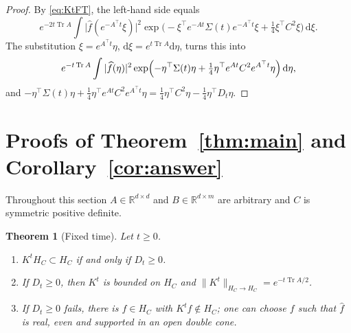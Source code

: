 \documentclass[11pt]{amsart}
\numberwithin{equation}{section}
\newtheorem{theorem}{Theorem}[section]
\theoremstyle{definition}
\theoremstyle{remark}
\newcommand{\R}{\mathbb{R}}
\newcommand{\Tr}{\operatorname{Tr}}
\newcommand{\dd}{\,\mathrm{d}}
\newcommand{\hatf}[1]{\widehat{#1}}
\newcommand{\tp}{\top}
\begin{document}
\begin{proof}
By \eqref{eq:KtFT}, the left-hand side equals
\[
e^{-2t\Tr A}\int\bigl|\hatf f(e^{-A^\tp t}\xi)\bigr|^2
\exp\bigl(-\xi^\tp e^{-At}\Sigma(t)e^{-A^\tp t}\xi+\tfrac14\xi^\tp C^2\xi\bigr)\dd\xi .
\]
The substitution $\xi=e^{A^\tp t}\eta$, $\mathrm d\xi=e^{t\Tr A}\mathrm d\eta$, turns this into
\[
e^{-t\Tr A}\int|\hatf f(\eta)|^2\exp\Bigl(-\eta^\tp\Sigma(t)\eta+\tfrac14\eta^\tp e^{At}C^2e^{A^\tp t}\eta\Bigr)\dd\eta ,
\]
and $-\eta^\tp\Sigma(t)\eta+\frac14\eta^\tp e^{At}C^2e^{A^\tp t}\eta=\frac14\eta^\tp C^2\eta-\frac14\eta^\tp D_t\eta$.
\end{proof}

\section{Proofs of Theorem~\ref{thm:main} and Corollary~\ref{cor:answer}}\label{sec:proofs}

Throughout this section $A\in\R^{d\times d}$ and $B\in\R^{d\times m}$ are arbitrary and $C$ is symmetric positive
definite.

\begin{theorem}[Fixed time]\label{thm:fixed}
Let $t\ge0$.
\begin{enumerate}
\item[(a)] $K^tH_C\subset H_C$ if and only if $D_t\ge0$.
\item[(b)] If $D_t\ge0$, then $K^t$ is bounded on $H_C$ and $\|K^t\|_{H_C\to H_C}=e^{-t\Tr A/2}$.
\item[(c)] If $D_t\ge0$ fails, there is $f\in H_C$ with $K^tf\notin H_C$; one can choose $f$ such that $\hatf f$ is real,
even and supported in an open double cone.
\end{enumerate}
\end{theorem}
\end{document}
